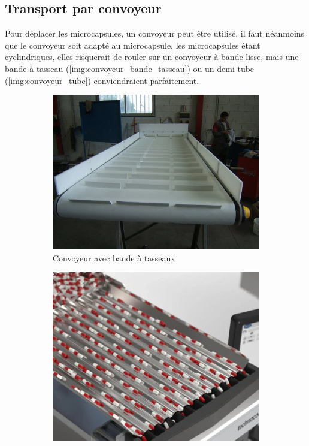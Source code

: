 \subsection*{Transport par convoyeur}
Pour déplacer les \glspl{microcapsule}, un convoyeur peut être utilisé, il faut néanmoins que le convoyeur soit adapté au \gls{microcapsule}, les \glspl{microcapsule} étant cyclindriques, elles risquerait de rouler sur un convoyeur à bande lisse, mais une bande à tasseau (\cf \autoref{img:convoyeur_bande_tasseau}) ou un demi-tube  (\cf \autoref{img:convoyeur_tube}) conviendraient parfaitement.
\begin{figure}[h!]
    \centering
    \begin{subfigure}{0.45\textwidth}
        \centering
        \includegraphics[width=\linewidth]{assets/figures/Hardware/transport_conv/convoyeur_tasseau.JPG}
        \caption{Convoyeur avec bande à tasseaux\footnotemark}
        \label{img:convoyeur_bande_tasseau}
    \end{subfigure}\hfill
    \begin{subfigure}{0.45\textwidth}
        \centering
        \includegraphics[width=\linewidth]{assets/figures/Hardware/transport_conv/convoyeur_tube.png}

\end{subfigure}
\end{figure}
